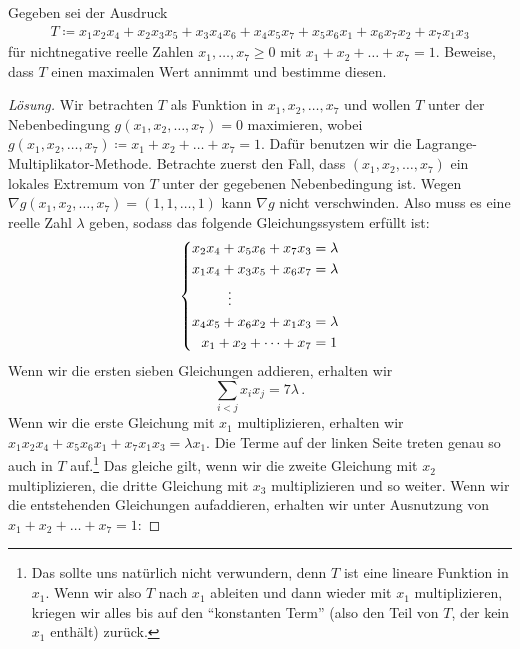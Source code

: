 \begin{aufgabe*}
	Gegeben sei der Ausdruck
	\begin{align*}
		T\coloneqq x_1x_2x_4+x_2x_3x_5+x_3x_4x_6+x_4x_5x_7+x_5x_6x_1+x_6x_7x_2+x_7x_1x_3
	\end{align*}
	für nichtnegative reelle Zahlen $x_1,\ldots,x_7\geqslant 0$ mit $x_1+x_2+\ldots+x_7=1$. Beweise, dass $T$ einen maximalen Wert annimmt und bestimme diesen.
\end{aufgabe*}
\begin{proof}[Lösung]
	Wir betrachten $T$ als Funktion in $x_1,x_2,\dotsc,x_7$ und wollen $T$ unter der Nebenbedingung $g(x_1,x_2,\dotsc,x_7)=0$ maximieren, wobei $g(x_1,x_2,\dotsc,x_7)\coloneqq x_1+x_2+\ldots+x_7=1$. Dafür benutzen wir die Lagrange-Multiplikator-Methode. Betrachte zuerst den Fall, dass $(x_1,x_2,\dotsc,x_7)$ ein lokales Extremum von $T$ unter der gegebenen Nebenbedingung ist. Wegen $\nabla g(x_1,x_2,\dotsc,x_7)=(1,1,\dotsc,1)$ kann $\nabla g$ nicht verschwinden. Also muss es eine reelle Zahl $\lambda$ geben, sodass das folgende Gleichungssystem erfüllt ist:
	\begin{equation*}
		\left\{\begin{alignedat}{3}
			x_2x_4&+x_5x_6&&+x_7x_3&&=\lambda\\
			x_1x_4&+x_3x_5&&+x_6x_7&&=\lambda\\
			&\mathrel{\tikz[inner sep=0,outer sep=0]{\node at (0,-0.5ex) {$\phantom{=}$};\node at (0,0) {$\vdots$};}}\\
			x_4x_5&+x_6x_2&&+x_1x_3&&=\lambda\\
			&&&&\llap{$x_1+x_2+\dotsb+x_7$}&=1
		\end{alignedat}\right.
	\end{equation*}
	Wenn wir die ersten sieben Gleichungen addieren, erhalten wir
	\begin{equation*}
		\sum_{i<j}x_ix_j=7\lambda\,.
	\end{equation*}
	Wenn wir die erste Gleichung mit $x_1$ multiplizieren, erhalten wir $x_1x_2x_4+x_5x_6x_1+x_7x_1x_3=\lambda x_1$. Die Terme auf der linken Seite treten genau so auch in $T$ auf.\footnote{Das sollte uns natürlich nicht verwundern, denn $T$ ist eine lineare Funktion in $x_1$. Wenn wir also $T$ nach $x_1$ ableiten und dann wieder mit $x_1$ multiplizieren, kriegen wir alles bis auf den \enquote{konstanten Term} (also den Teil von $T$, der kein $x_1$ enthält) zurück.} Das gleiche gilt, wenn wir die zweite Gleichung mit $x_2$ multiplizieren, die dritte Gleichung mit $x_3$ multiplizieren und so weiter. Wenn wir die entstehenden Gleichungen aufaddieren, erhalten wir unter Ausnutzung von $x_1+x_2+\dotsc+x_7=1$:

\end{proof}

